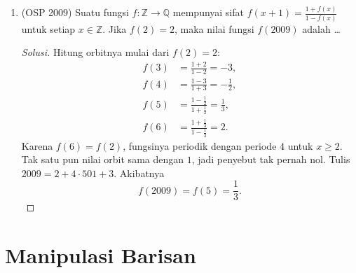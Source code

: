 \documentclass[12pt]{scrartcl}
\begin{document}
\begin{enumerate}[resume]
	\item (OSP 2009)
	Suatu fungsi $f : \mathbb{Z} \rightarrow \mathbb{Q}$ mempunyai sifat $f(x+1) = \frac{1+f(x)}{1-f(x)}$ untuk setiap $x \in \mathbb{Z}$. Jika $f(2) = 2$, maka nilai fungsi $f(2009)$ adalah \dots
	\begin{proof}[Solusi]
	\renewcommand{\qedsymbol}{$\blacksquare$}
	Hitung orbitnya mulai dari $f(2) = 2$:
	\begin{align*}
	f(3) &= \frac{1+2}{1-2} = -3, \\
	f(4) &= \frac{1-3}{1+3} = -\frac{1}{2}, \\
	f(5) &= \frac{1-\frac12}{1+\frac12} = \frac{1}{3}, \\
	f(6) &= \frac{1+\frac13}{1-\frac13} = 2.
	\end{align*}
	Karena $f(6) = f(2)$, fungsinya periodik dengan periode $4$ untuk
	$x \ge 2$. Tak satu pun nilai orbit sama dengan $1$, jadi penyebut
	tak pernah nol. Tulis $2009 = 2 + 4 \cdot 501 + 3$. Akibatnya
	\[ f(2009) = f(5) = \frac{1}{3}. \]
	\end{proof}

\end{enumerate}

\section{Manipulasi Barisan}
\end{document}
